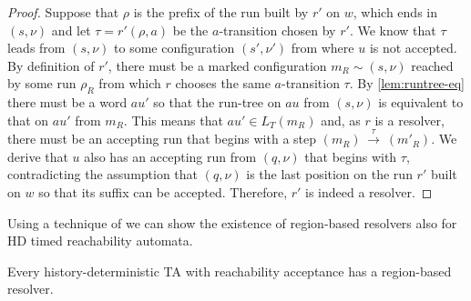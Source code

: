 \documentclass[10pt,a4paper]{amsart}
\theoremstyle{definition}
\numberwithin{equation}{section}
\newcommand{\lang}{L_T}  %
\newcommand{\step}[2][]{\Step{#2}{}{#1}}
\newcommand{\Step}[3]{\ensuremath{\,{\stackrel{#1}{\longrightarrow}}{}^{\scriptstyle{#2}}_{\scriptstyle{#3}}}\,}
\newcommand{\req}{\sim}
\begin{document}
\begin{proof}
Suppose that $\rho$ is the prefix of the run
built by $r'$ on $w$, which ends in
$(s,\nu)$  and let $\tau = r'(\rho,a)$ be the $a$-transition chosen by $r'$.
We know that $\tau$ leads from $(s,\nu)$ to some configuration $(s',\nu')$ 
from where $u$ is not accepted.
By definition of $r'$, there must be a marked configuration $m_R\req (s,\nu)$ 
reached by some run $\rho_R$ %
from which $r$ chooses the same $a$-transition $\tau$. 
By \cref{lem:runtree-eq} there must be a word $au'$ so that
the run-tree on $au$ from $(s,\nu)$ is equivalent to that on $au'$ from $m_R$.
This means that $au'\in\lang(m_R)$ and, as $r$ is a resolver,
there must be an accepting run that begins with a step $(m_R)\step{\tau}(m'_R)$.
We derive that $u$ also has an accepting run from $(q,\nu)$ that begins with $\tau$, contradicting the assumption that $(q, \nu)$ is the last position on the run $r'$ built on $w$ so that its suffix can be accepted.
Therefore, $r'$ is indeed a resolver.
\end{proof}

Using a technique of \cite{BL22} we can show the existence of region-based resolvers also for HD timed reachability automata.

\begin{lemma}
    \label{lem:positional-reach-resolvers}
Every history-deterministic TA with reachability acceptance has a region-based resolver.
\end{lemma}
\end{document}
